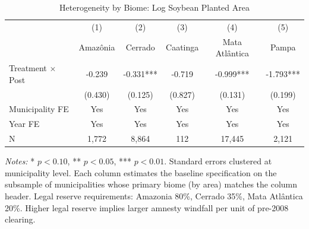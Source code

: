 \begin{table}[H]
\centering
\caption{Heterogeneity by Biome: Log Soybean Planted Area}
\begin{threeparttable}
\begin{tabular}{lccccc}
\toprule
 & (1) & (2) & (3) & (4) & (5) \\
 & Amazônia & Cerrado & Caatinga & Mata Atlântica & Pampa \\
\midrule
Treatment $\times$ Post & -0.239 & -0.331*** & -0.719 & -0.999*** & -1.793*** \\
 & (0.430) & (0.125) & (0.827) & (0.131) & (0.199) \\
\midrule
Municipality FE & Yes & Yes & Yes & Yes & Yes \\
Year FE & Yes & Yes & Yes & Yes & Yes \\
N & 1,772 & 8,864 & 112 & 17,445 & 2,121 \\
\bottomrule
\end{tabular}
\begin{tablenotes}[flushleft]
\small
\item \textit{Notes:} * $p<0.10$, ** $p<0.05$, *** $p<0.01$. Standard errors clustered at municipality level. Each column estimates the baseline specification on the subsample of municipalities whose primary biome (by area) matches the column header. Legal reserve requirements: Amazonia 80\%, Cerrado 35\%, Mata Atl\^{a}ntica 20\%. Higher legal reserve implies larger amnesty windfall per unit of pre-2008 clearing.
\end{tablenotes}
\end{threeparttable}
\label{tab:biome}
\end{table}

